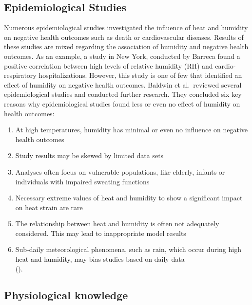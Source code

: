 \documentclass[
]{krantz}
\providecommand{\tightlist}{%
  \setlength{\itemsep}{0pt}\setlength{\parskip}{0pt}}
\begin{document}
\subsection{Epidemiological Studies}\label{epidemiological-studies}

Numerous epidemiological studies investigated the influence of heat and humidity on negative health outcomes such as death or cardiovascular diseases. Results of these studies are mixed regarding the association of humidity and negative health outcomes. As an example, a study in New York, conducted by Barreca found a positive correlation between high levels of relative humidity (RH) and cardio-respiratory hospitalizations. However, this study is one of few that identified an effect of humidity on negative health outcomes.
Baldwin et al.~reviewed several epidemiological studies and conducted further research. They concluded six key reasons why epidemiological studies found less or even no effect of humidity on health outcomes:

\begin{enumerate}
\def\labelenumi{\arabic{enumi})}
\tightlist
\item
  At high temperatures, humidity has minimal or even no influence on negative health outcomes\\
\item
  Study results may be skewed by limited data sets\\
\item
  Analyses often focus on vulnerable populations, like elderly, infants or individuals with impaired sweating functions\\
\item
  Necessary extreme values of heat and humidity to show a significant impact on heat strain are rare\\
\item
  The relationship between heat and humidity is often not adequately considered. This may lead to inappropriate model results\\
\item
  Sub-daily meteorological phenomena, such as rain, which occur during high heat and humidity, may bias studies based on daily data\\
  (\citet{bald}).
\end{enumerate}

\subsection{Physiological knowledge}\label{physiological-knowledge}
\end{document}
